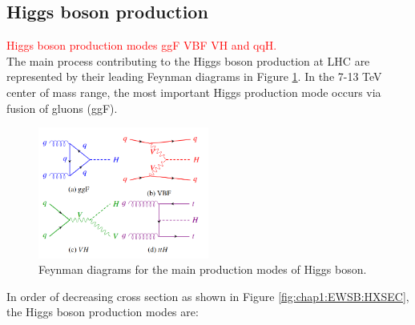 \subsection{Higgs boson production}
\label{chap1:EWSB:HP}
\textcolor{red}{Higgs boson production modes ggF VBF VH and qqH. \\}
The main process contributing to the Higgs boson production at LHC are represented by their leading Feynman diagrams in Figure \ref{fig:chap1:EWSB:HP}. In the 7-13 TeV center of mass range, the most important Higgs production mode occurs via fusion of gluons (ggF). 
\begin{figure}[htbp]
    \centering
    \includegraphics[width=0.5\textwidth]{Ch1/Img/Higgs_prod_modes.png}
    \caption{Feynman diagrams for the main production modes of Higgs boson.}
    \label{fig:chap1:EWSB:HP}
\end{figure}
In order of decreasing cross section as shown in Figure \ref{fig:chap1:EWSB:HXSEC}, the Higgs boson production modes are:
